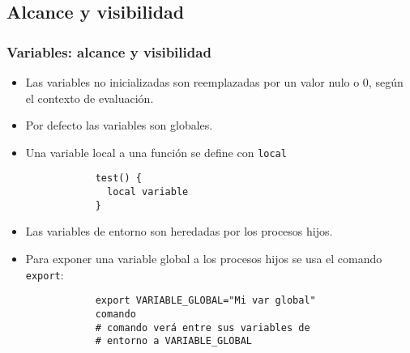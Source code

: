 \subsection{Alcance y visibilidad}
\begin{frame}[fragile]
	\frametitle{Variables: alcance y visibilidad}
	\begin{itemize}
		\item Las variables no inicializadas son reemplazadas por un valor nulo o 0, según el contexto de evaluación.
		\item Por defecto las variables son globales.
		\item Una variable local a una función se define con \texttt{local}
		\begin{lstlisting}
			test() {
			  local variable
			}
		\end{lstlisting}
		\item Las variables de entorno son heredadas por los procesos hijos.
		\item Para exponer una variable global a los procesos hijos se usa
          el comando \texttt{export}:
		\begin{lstlisting}
			export VARIABLE_GLOBAL="Mi var global"
			comando
			# comando verá entre sus variables de
			# entorno a VARIABLE_GLOBAL
		\end{lstlisting}
	\end{itemize}
\end{frame}

